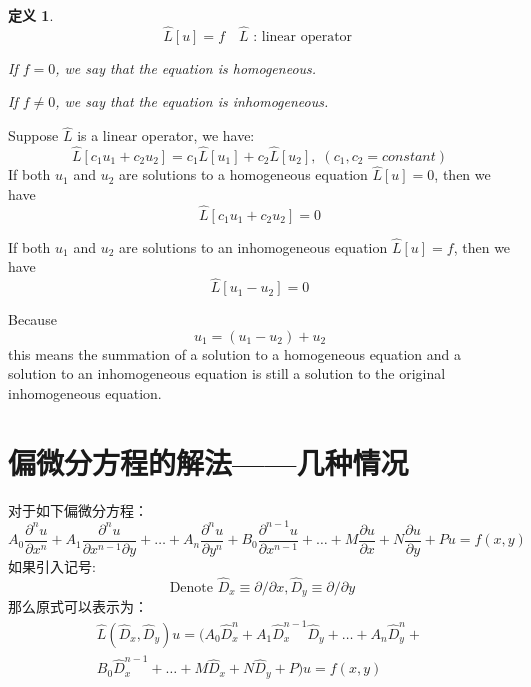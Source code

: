 \documentclass[10pt, a4paper, oneside]{ctexbook}
\newtheorem{definition}[theorem]{定义}
\begin{document}
\begin{definition}
    $$
        \hat{L}[u]=f \quad \hat{L} \text { : linear operator }
    $$
    \rm

    If $f=0$, we say that the equation is {\color{red}homogeneous}.

    If $f\ne0$, we say that the equation is {\color{red}inhomogeneous}.
\end{definition}
Suppose $\hat{L}$ is a linear operator, we have:
$$\hat{L}\left[c_{1} u_{1}+c_{2} u_{2}\right]=c_{1} \hat{L}\left[u_{1}\right]+c_{2} \hat{L}\left[u_{2}\right], \; (c_{1}, c_{2}=constant)$$
If both $u_{1}$ and $u_{2}$ are solutions to a homogeneous equation $\hat{L}[u]=0$, then we have $$\hat{L}\left[c_{1} u_{1}+c_{2} u_{2}\right]=0$$

If both $u_{1}$ and $u_{2}$ are solutions to an inhomogeneous equation $\hat{L}[u]=f$, then we have $$\hat{L}\left[u_{1}-u_{2}\right]=0$$

Because $$u_{1}=\left(u_{1}-u_{2}\right)+u_{2}$$ this means the summation of a solution to a homogeneous equation and a solution to an inhomogeneous equation is still a solution to the original inhomogeneous equation.
\section{偏微分方程的解法——几种情况}
对于如下偏微分方程：
$$
    A_{0} \frac{\partial^{n} u}{\partial x^{n}}+A_{1} \frac{\partial^{n} u}{\partial x^{n-1} \partial y}+\ldots+A_{n} \frac{\partial^{n} u}{\partial y^{n}}+B_{0} \frac{\partial^{n-1} u}{\partial x^{n-1}}+\ldots+M \frac{\partial u}{\partial x}+N \frac{\partial u}{\partial y}+P u=f(x, y)
$$
如果引入记号:
$$
    \text { Denote } \hat{D}_{x} \equiv \partial / \partial x, \hat{D}_{y} \equiv \partial / \partial y
$$
那么原式可以表示为：
\begin{align*}
    \hat{L}(\hat{D}_{x}, \hat{D}_{y}) u=(A_{0} \hat{D}_{x}^{n}+A_{1} \hat{D}_{x}^{n-1} \hat{D}_{y}+\ldots+A_{n} \hat{D}_{y}^{n}+
    \\ B_{0} \hat{D}_{x}^{n-1}+\ldots+M \hat{D}_{x}+N \hat{D}_{y}+P) u=f(x, y)
\end{align*}
\end{document}
